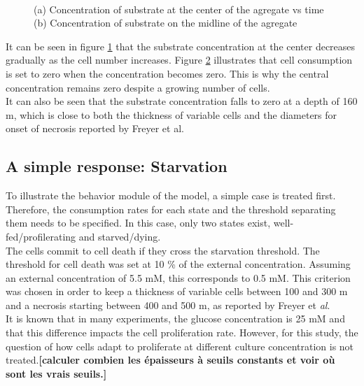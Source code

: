 \documentclass[11pt,a4paper]{article}
\begin{document}
\begin{figure}[ht!]
\begin{subfigure}{0.5\textwidth}
	\centering
	
	\caption{ \label{ref_S_center}}
\end{subfigure}
~~
\begin{subfigure}{0.5\textwidth}
	\centering
	
	\caption{\label{S_ref_midline}}
\end{subfigure}
\caption{(a) Concentration of substrate at the center of the agregate vs time (b) Concentration of substrate on the midline of the agregate \label{ref_nutrients}}
\end{figure}

It can be seen in figure \ref{ref_S_center} that the substrate concentration at the center decreases gradually as the cell number increases. Figure \ref{S_ref_midline} illustrates that cell consumption is set to zero when the concentration becomes zero. This is why the central concentration remains zero despite a growing number of cells.\\

It can also be seen that the substrate concentration falls to zero at a depth of 160 \textmu m, which is close to both the thickness of variable cells and the diameters for onset of necrosis reported by Freyer et al.\cite{Freyer1986}\cite{Freyer1988}

\subsection{A simple response: Starvation}
To illustrate the behavior module of the model, a simple case is treated first. Therefore, the consumption rates for each state and the threshold separating them needs to be specified. In this case, only two states exist, well-fed/profilerating and starved/dying.\\

The cells commit to cell death if they cross the starvation threshold. The threshold for cell death was set at 10 \% of the external concentration. Assuming an external concentration of 5.5 mM, this corresponds to 0.5 mM. This criterion was chosen in order to keep a thickness of variable cells between 100 and 300 \textmu m and a necrosis starting between 400 and 500 \textmu m, as reported by Freyer et \textit{al}.\cite{Freyer1986}\\

It is known that in many experiments, the glucose concentration is 25 mM and that this difference impacts the cell proliferation rate. However, for this study, the question of how cells adapt to proliferate at different culture concentration is not treated.\textbf{[calculer combien les épaisseurs à seuils constants et voir où sont les vrais seuils.]}
\\
\end{document}
